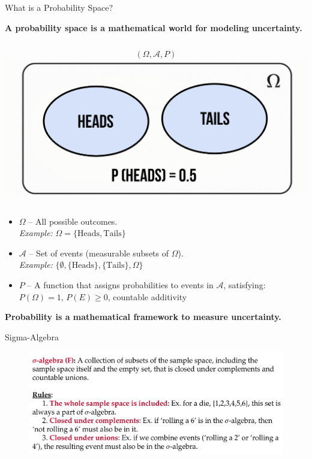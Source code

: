 \documentclass[handout,aspectratio=169]{beamer}
\begin{document}
\begin{frame}{What is a Probability Space?}
	    
	\textbf{A probability space is a mathematical world for modeling uncertainty.}
	\vspace{1em}
	\begin{columns}
		\[
			(\Omega, \mathcal{A}, P)
		\]
		\includegraphics[width=\linewidth]{chapter_figs/01_figs/space.jpg}
	\end{columns}
	\begin{itemize}
		\item $\Omega$ – All possible outcomes. \\
		      \textit{Example:} $\Omega = \{\text{Heads}, \text{Tails}\}$
		\item $\mathcal{A}$ – Set of events (measurable subsets of $\Omega$). \\
		      \textit{Example:} $\{\emptyset, \{\text{Heads}\}, \{\text{Tails}\}, \Omega\}$
		\item $P$ – A function that assigns probabilities to events in $\mathcal{A}$, satisfying:\\
		      \quad $P(\Omega) = 1$, \quad $P(E) \geq 0$, \quad countable additivity
	\end{itemize}
	
	\vspace{0.5em}
	\textbf{Probability is a mathematical framework to measure uncertainty.}
\end{frame}

\begin{frame}{Sigma-Algebra}
  \begin{figure}[htbp]
		\centering
		\includegraphics[width=\textwidth]{chapter_figs/01_figs/sigma_algebra.png}
	\end{figure}
\end{frame}
\end{document}
